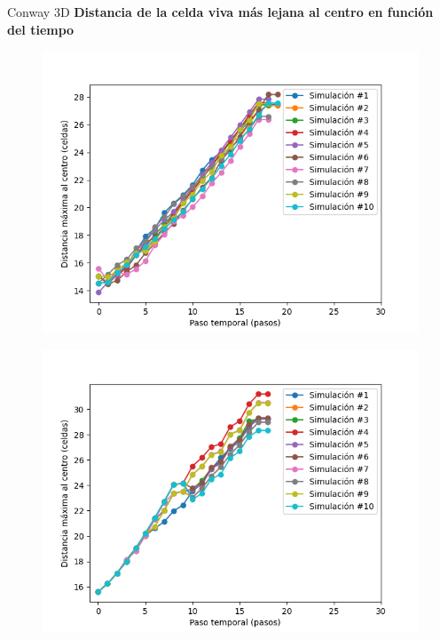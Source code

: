 \begin{frame}{Conway 3D}
    \textbf{Distancia de la celda viva más lejana al centro en función del tiempo}
    \begin{multicols}{2}
        {
            \begin{figure}[H]
                \centering
                \includegraphics[width=0.8\linewidth]{pic/conway3d/distance_i10}
                \label{fig:conway3d:distance:i10}
            \end{figure}
        }

        {
            \begin{figure}[H]
                \centering
                \includegraphics[width=0.8\linewidth]{pic/conway3d/distance_i90}
                \label{fig:conway3d:distance:i90}
            \end{figure}
        }
    \end{multicols}
\end{frame}


